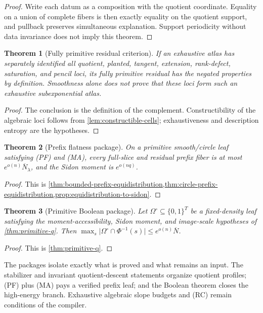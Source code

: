 \documentclass[12pt,a4paper]{amsart}
\numberwithin{equation}{section}
\newtheorem{theorem}{Theorem}[section]
\theoremstyle{remark}
\newcommand{\Omc}{\Omega^{\circ}}
\newcommand{\barN}{\overline N}
\newcommand{\abs}[1]{\lvert #1\rvert}
\begin{document}
\begin{proof}
Write each datum as a composition with the quotient coordinate.  Equality
on a union of complete fibers is then exactly equality on the quotient
support, and pullback preserves simultaneous explanation.  Support
periodicity without data invariance does not imply this theorem.
\end{proof}

\begin{theorem}[Fully primitive residual criterion]\label{thm:aperiodic-package}
If an exhaustive atlas has separately identified all quotient, planted,
tangent, extension, rank-defect, saturation, and pencil loci, its
\emph{fully primitive residual} has the negated properties by definition.
Smoothness alone does not prove
that these loci form such an exhaustive subexponential atlas.
\end{theorem}

\begin{proof}
The conclusion is the definition of the complement.  Constructibility of
the algebraic loci follows from \cref{lem:constructible-cells};
exhaustiveness and description entropy are the hypotheses.
\end{proof}

\begin{theorem}[Prefix flatness package]\label{thm:prefix-flatness-package}
On a primitive smooth/circle leaf satisfying \textup{(PF)} and
\textup{(MA)}, every full-slice and residual prefix fiber is at most
\(e^{o(n)}\barN_\lambda\), and the Sidon moment is
\(e^{o(nq)}\).
\end{theorem}

\begin{proof}
This is
\cref{thm:bounded-prefix-equidistribution,thm:circle-prefix-equidistribution,prop:equidistribution-to-sidon}.
\end{proof}

\begin{theorem}[Primitive Boolean package]\label{thm:boolean-package}
Let \(\Omc\subseteq\{0,1\}^T\) be a fixed-density leaf satisfying the
moment-accessibility, Sidon moment, and image-scale hypotheses of
\cref{thm:primitive-q}.  Then
\(\max_s\abs{\Omc\cap\Phi^{-1}(s)}\le e^{o(n)}\barN\).
\end{theorem}

\begin{proof}
This is \cref{thm:primitive-q}.
\end{proof}

The packages isolate exactly what is proved and what remains an input.  The
stabilizer and invariant quotient-descent statements organize quotient profiles;
\textup{(PF)} plus \textup{(MA)} pays a verified prefix leaf; and the
Boolean theorem closes the high-energy branch.  Exhaustive algebraic slope
budgets and \textup{(RC)} remain conditions of the compiler.
\end{document}

